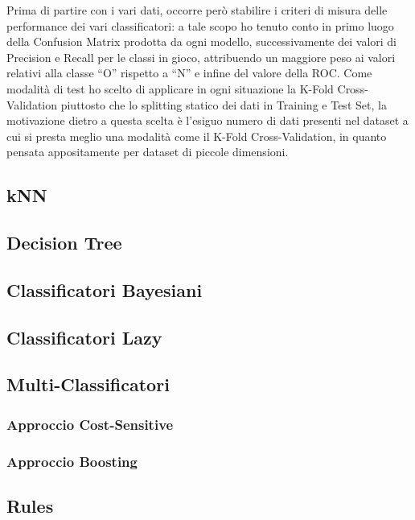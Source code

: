 
Prima di partire con i vari dati, occorre però stabilire i criteri di misura delle performance dei vari classificatori:
a tale scopo ho tenuto conto in primo luogo della Confusion Matrix prodotta da ogni modello, successivamente dei valori di Precision e Recall per le classi in gioco, attribuendo un maggiore peso ai valori relativi alla classe ``O'' rispetto a ``N'' e infine del valore della ROC\@.
Come modalità di test ho scelto di applicare in ogni situazione la K-Fold Cross-Validation piuttosto che lo splitting statico dei dati in Training e Test Set, la motivazione dietro a questa scelta è l'esiguo numero di dati presenti nel dataset a cui si presta meglio una modalità come il K-Fold Cross-Validation,
in quanto pensata appositamente per dataset di piccole dimensioni.


\subsection{kNN}
\subsection{Decision Tree}
\subsection{Classificatori Bayesiani}
\subsection{Classificatori Lazy}
\subsection{Multi-Classificatori}
\subsubsection{Approccio Cost-Sensitive}
\subsubsection{Approccio Boosting}
\subsection{Rules}
